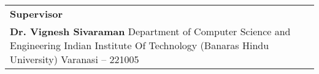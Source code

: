 \begin{table}[h]
\begin{tabularx}{\textwidth}{>{\raggedright\arraybackslash}X} %
\textbf{Supervisor}
\\
\textbf{Dr. Vignesh Sivaraman} \newline
Department of Computer Science and Engineering \newline
Indian Institute Of Technology \newline
(Banaras Hindu University) \newline
Varanasi – 221005
\\
\end{tabularx}
\end{table}